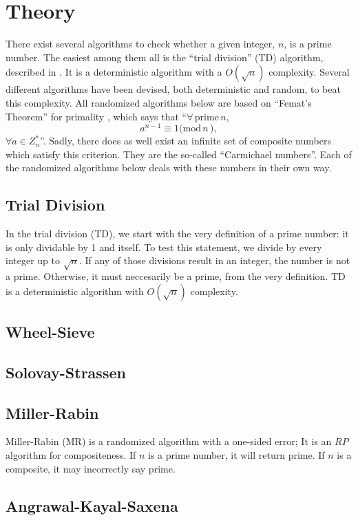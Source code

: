 \section{Theory}
There exist several algorithms to check whether a given integer, $n$, is a prime number.
The easiest among them all is the ``trial division'' (TD) algorithm, described in .
It is a deterministic algorithm with a $O(\sqrt{n})$ complexity.
Several different algorithms have been devised, both deterministic and random, to beat this complexity.
All randomized algorithms below are based on ``Femat's Theorem'' for primality \cite{book:RA}, which says that ``$\forall \, \mathrm{prime} \, n$,
\begin{equation}
	a^{n-1} \equiv 1 \mathrm{(mod}\, n\, \mathrm{)},
\end{equation}
$\forall a \in Z_n^*$''.
Sadly, there does as well exist an infinite set of composite numbers which satisfy this criterion.
They are the so-called ``Carmichael numbers''.
Each of the randomized algorithms below deals with these numbers in their own way.

\subsection{Trial Division} \label{sec:TD_theory}
In the trial division (TD), we start with the very definition of a prime number: it is only dividable by 1 and itself.
To test this statement, we divide by every integer up to $\sqrt{n}$.
If any of those divisions result in an integer, the number is not a prime.
Otherwise, it must neccesarily be a prime, from the very definition.
TD is a deterministic algorithm with $O(\sqrt{n})$ complexity.

\subsection{Wheel-Sieve} \label{sec:WS_theory}

\subsection{Solovay-Strassen} \label{sec:SS_theory}

\subsection{Miller-Rabin} \label{sec:MR_theory}
Miller-Rabin (MR) is a randomized algorithm with a one-sided error; It is an $RP$ algorithm for compositeness.
If $n$ is a prime number, it will return prime. If $n$ is a composite, it may incorrectly say prime.

\subsection{Angrawal-Kayal-Saxena} \label{sec:AKS_theory}


